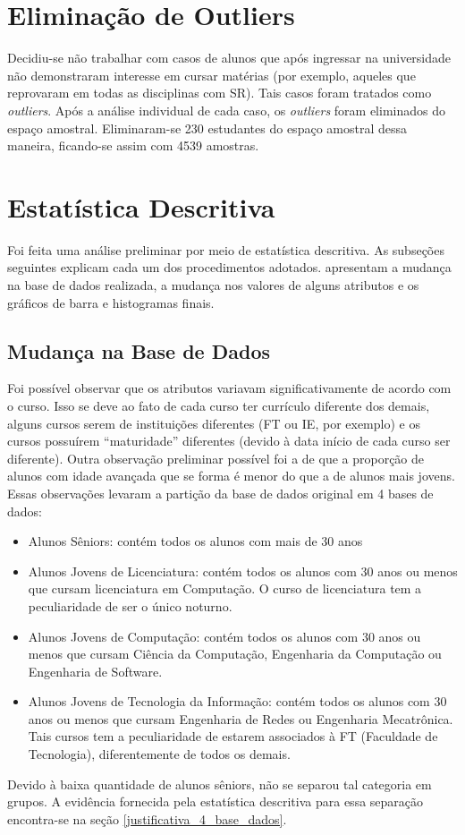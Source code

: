 \section{Eliminação de Outliers}
Decidiu-se não trabalhar com casos de alunos que após ingressar na universidade não
demonstraram interesse em cursar matérias (por exemplo, aqueles que reprovaram em
todas as disciplinas com SR). Tais casos foram tratados como \textit{outliers}.
Após a análise individual de cada caso, os \textit{outliers} foram eliminados do espaço
amostral. Eliminaram-se 230 estudantes do espaço amostral dessa maneira, ficando-se
assim com 4539 amostras.

\section{Estatística Descritiva}
Foi feita uma análise preliminar por meio de estatística descritiva. As subseções
seguintes explicam cada um dos procedimentos adotados. apresentam a mudança na base
de dados realizada, a mudança nos valores de alguns atributos e os gráficos de barra
e histogramas finais. 

\subsection{Mudança na Base de Dados}
\par Foi possível observar que os atributos variavam significativamente de acordo com
o curso. Isso se deve ao fato de cada curso ter currículo diferente dos
demais, alguns cursos serem de instituições diferentes (FT ou IE, por exemplo) e os
cursos possuírem ``maturidade'' diferentes (devido à data início de cada curso ser
diferente). Outra observação preliminar possível foi a de que a proporção de alunos
com idade avançada que se forma é menor do que a de alunos mais jovens. Essas
observações levaram a partição da base de dados original em 4 bases de dados: 
\begin{itemize}
    \item Alunos Sêniors: contém todos os alunos com mais de 30 anos
    \item Alunos Jovens de Licenciatura: contém todos os alunos com 30 anos ou menos
        que cursam licenciatura em Computação. O curso de licenciatura tem a
        peculiaridade de ser o único noturno. 
    \item Alunos Jovens de Computação: contém todos os alunos com 30 anos ou menos
        que cursam Ciência da Computação, Engenharia da Computação ou Engenharia de
        Software. 
    \item Alunos Jovens de Tecnologia da Informação: contém todos os alunos com 30
        anos ou menos que cursam Engenharia de Redes ou Engenharia Mecatrônica. Tais
        cursos tem a peculiaridade de estarem associados à FT (Faculdade de
        Tecnologia), diferentemente de todos os demais.  
\end{itemize}
Devido à baixa quantidade de alunos sêniors, não se separou tal categoria em grupos.
A evidência fornecida pela estatística descritiva para essa separação
encontra-se na seção \ref{justificativa_4_base_dados}.

